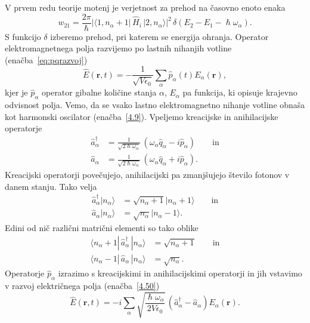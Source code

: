 V prvem redu teorije motenj je verjetnost za prehod na časovno enoto enaka
\begin{equation}
w_{21}=\frac{2\pi}{\hslash}|\langle1,n_{\alpha}+
1|\,\hat{H}_{i}\,|2,n_{\alpha}\rangle|^{2}\,
\delta(E_{2}-E_{1}-\hslash\omega_{\alpha}).
\label{4.49}
\end{equation}
S funkcijo $\delta$ izberemo prehod, pri katerem se energija ohranja.
Operator elektromagnetnega polja razvijemo po lastnih nihanjih votline (enačba~\ref{eq:pqrazvoj}) 
\begin{equation}
\hat{E}(\mathbf{r},t)=-\frac{1}{\sqrt{V\epsilon_{0}}}\sum_{\alpha}
\hat{p}_{\alpha}(t)E_{\alpha}(\mathbf{r}),
\label{4.50}
\end{equation}
kjer je $\hat{p}_{\alpha}$ operator gibalne količine stanja $\alpha$, $E_{\alpha}$
pa funkcija, ki opisuje krajevno odvisnost polja. Vemo, da se vsako lastno
elektromagnetno nihanje votline obnaša kot harmonski oscilator (enačba~\ref{4.9}).
Vpeljemo kreacijske in anihilacijske operatorje
\begin{align}
\hat{a}_{\alpha}^{\dagger} & =  \frac{1}{\sqrt{2\hslash\omega_{\alpha}}}\,
(\omega_{\alpha}\hat{q}_{\alpha}-i\hat{p}_{\alpha}) \qquad \mathrm{in} \\
\hat{a}_{\alpha} & =  \frac{1}{\sqrt{2\hslash\omega_{\alpha}}}\,(\omega_{\alpha}\hat{q}_{\alpha}+i\hat{p}_{\alpha}).
\end{align}
Kreacijski operatorji povečujejo, anihilacijski pa zmanjšujejo število
fotonov v danem stanju. Tako velja
\begin{align}
\hat{a}_{\alpha}^{\dagger}|n_{\alpha}\rangle & =  \sqrt{n_{\alpha}+1}
|n_{\alpha}+1\rangle\qquad \mathrm{in} \\
\hat{a}_{\alpha}|n_{\alpha}\rangle & =  \sqrt{n_{\alpha}}|n_{\alpha}-1\rangle.
\end{align}
Edini od nič različni matrični elementi so tako oblike
\begin{align}
\langle n_\alpha +1|\, \hat{a}_{\alpha}^{\dagger}\,|n_{\alpha}\rangle & = 
\sqrt{n_{\alpha}+1} \qquad \mathrm{in} \label{eq:ankr.1}\\
\langle n_\alpha-1|\,\hat{a}_{\alpha}\,|n_{\alpha}\rangle & =  \sqrt{n_{\alpha}}.
\label{eq:ankr}
\end{align}
Operatorje $\hat{p}_{\alpha}$ izrazimo s kreacijskimi in anihilacijskimi
operatorji in jih vstavimo v razvoj električnega polja (enačba~\ref{4.50})
\begin{equation}
\hat{E}(\mathbf{r},t)=-i\sum_{\alpha}\sqrt{\frac{\hslash\omega_{\alpha}}{2V\epsilon_{0}}}\,
\left(\hat{a}_{\alpha}^{\dagger}-\hat{a}_{\alpha}\right)E_{\alpha}(\mathbf{r}).
\label{4.53}
\end{equation}
